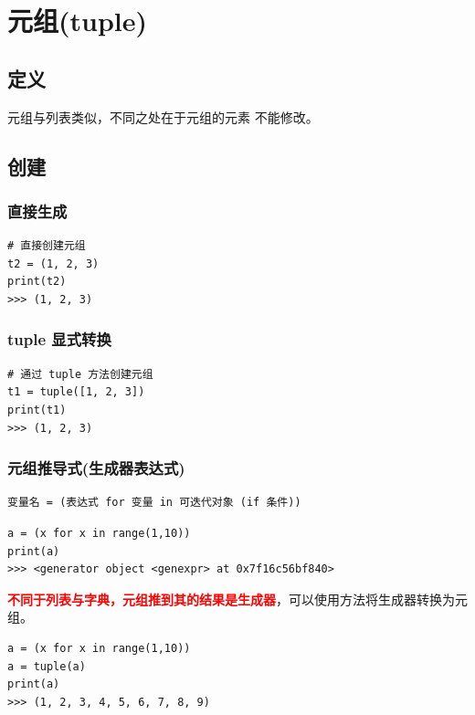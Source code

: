 \section{元组(tuple)}
\subsection{定义}
元组与列表类似，不同之处在于元组的元素 \textcolor{YBXPurple}{不能修改}。

\subsection{创建}
\subsubsection{直接生成}
\begin{lstlisting}[style=demostyle,numbers=none]
# 直接创建元组
t2 = (1, 2, 3)
print(t2)
>>> (1, 2, 3)
\end{lstlisting}

\subsubsection{tuple 显式转换}
\begin{lstlisting}[style=demostyle,numbers=none]
# 通过 tuple 方法创建元组
t1 = tuple([1, 2, 3])
print(t1)
>>> (1, 2, 3)
\end{lstlisting}

\subsubsection{元组推导式(生成器表达式)}
\begin{lstlisting}[style=demostyle,numbers=none]
变量名 = (表达式 for 变量 in 可迭代对象 (if 条件))
\end{lstlisting}

\begin{lstlisting}[style=pythonstyle]
a = (x for x in range(1,10))
print(a)
>>> <generator object <genexpr> at 0x7f16c56bf840>
\end{lstlisting}
\textcolor{red}{\textbf{不同于列表与字典，元组推到其的结果是生成器}}，可以使用方法将生成器转换为元组。
\begin{lstlisting}[style=pythonstyle]
a = (x for x in range(1,10))
a = tuple(a)
print(a)
>>> (1, 2, 3, 4, 5, 6, 7, 8, 9)
\end{lstlisting}